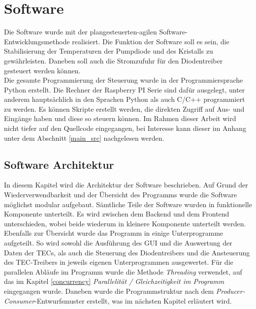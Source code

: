 \section{Software}
\label{chptr:software}
Die Software wurde mit der plangesteuerten-agilen Software-Entwicklungsmethode realisiert. 
Die Funktion der Software soll es sein, die Stabilisierung der Temperaturen der Pumpdiode und des Kristalls zu gewährleisten. Daneben soll auch die Stromzufuhr für den Diodentreiber gesteuert werden können.\\
Die gesamte Programmierung der Steuerung wurde in der Programmiersprache Python erstellt. Die Rechner der Raspberry PI Serie sind dafür ausgelegt, unter anderem hauptsächlich in den Sprachen Python als auch C/C++ programmiert zu werden. Es können Skripte erstellt werden, die direkten Zugriff auf Aus- und Eingänge haben und diese so steuern können. Im Rahmen dieser Arbeit wird nicht tiefer auf den Quellcode eingegangen, bei Interesse kann dieser im Anhang unter dem Abschnitt \ref{main_src} nachgelesen werden.\\


\subsection{Software Architektur}
\label{lab_software_architecture}
In diesem Kapitel wird die Architektur der Software beschrieben. Auf Grund der Wiederverwendbarkeit und der Übersicht des Programms wurde die Software möglichst modular aufgebaut. Sämtliche Teile der Software wurden in funktionelle Komponente unterteilt. Es wird zwischen dem Backend und dem Frontend unterschieden, wobei beide wiederum in kleinere Komponente unterteilt werden. Ebenfalls zur Übersicht wurde das Programm in einige Unterprogramme aufgeteilt. So wird sowohl die Ausführung des GUI und die Auswertung der Daten der TECs, als auch die Steuerung des Diodentreibers und die Ansteuerung des TEC-Treibers in jeweils eigenen Unterprogrammen ausgewertet. Für die parallelen Abläufe im Programm wurde die Methode \textit{Threading} verwendet, auf das im Kapitel \ref{concurrency} \textit{Parallelität / Gleichzeitigkeit im Programm} eingegangen wurde. Daneben wurde die Programmstruktur nach dem \textit{Producer-Consumer}-Entwurfsmuster erstellt, was im nächsten Kapitel erläutert wird.

